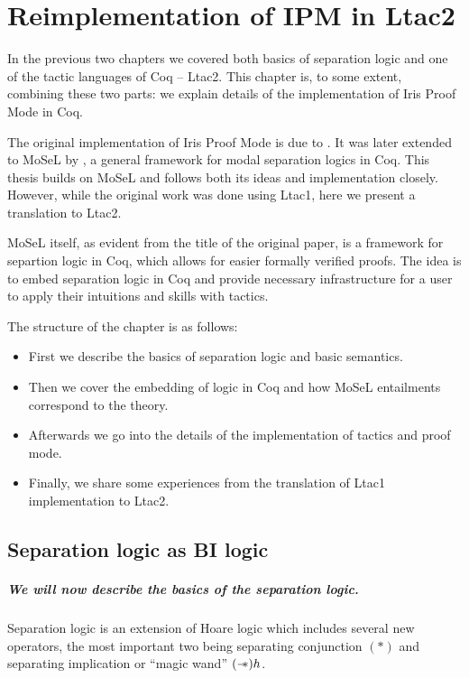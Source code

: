 \chapter{Reimplementation of IPM in Ltac2}
\label{chap:reimplementation_ipm}

In the previous two chapters we covered both basics of separation logic and one of the tactic languages of Coq -- Ltac2.
This chapter is, to some extent, combining these two parts: we explain details of the implementation of Iris Proof Mode in Coq.

The original implementation of Iris Proof Mode is due to
\citet{krebbersInteractiveProofsHigherorder2017}.
It was later extended to MoSeL by \citet{krebbersMoSeLGeneralExtensible2018}, a general framework for modal separation logics in Coq.
This thesis builds on MoSeL and follows both its ideas and implementation closely.
However, while the original work was done using Ltac1, here we present a translation to Ltac2.

MoSeL itself, as evident from the title of the original paper, is a framework for separtion logic in Coq, which allows for easier formally verified proofs.
The idea is to embed separation logic in Coq and provide necessary infrastructure for a user to apply their intuitions and skills with tactics.

The structure of the chapter is as follows:
\begin{itemize}
\item First we describe the basics of separation logic and basic semantics.
\item Then we cover the embedding of logic in Coq and how MoSeL entailments correspond to the theory.
\item Afterwards we go into the details of the implementation of tactics and proof mode.
\item Finally, we share some experiences from the translation of Ltac1 implementation to Ltac2.
\end{itemize}

\section{Separation logic as BI logic}
\label{sec:separation-logic-intro}
\paragraph{We will now describe the basics of the separation logic.}
Separation logic is an extension of Hoare logic which includes several new operators, the most important two being separating conjunction \((*)\) and separating implication or ``magic wand'' \((\mathrel{-\mkern-6mu*})h\).

